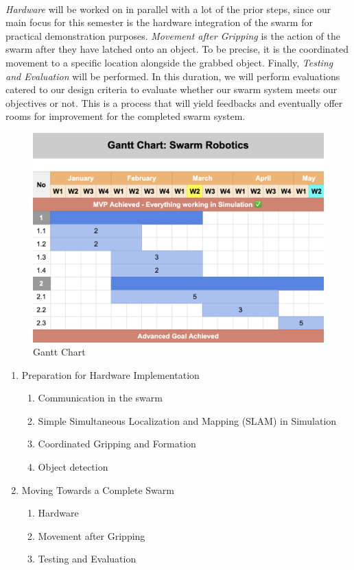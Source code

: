 \paragraph*{}
\textit{Hardware} will be worked on in parallel with a lot of the prior steps, since our main focus for this semester is the hardware integration of the swarm for practical demonstration purposes. \textit{Movement after Gripping} is the action of the swarm after they have latched onto an object. To be precise, it is the coordinated movement to a specific location alongside the grabbed object. Finally, \textit{Testing and Evaluation} will be performed. In this duration, we will perform evaluations catered to our design criteria to evaluate whether our swarm system meets our objectives or not. This is a process that will yield feedbacks and eventually offer rooms for improvement for the completed swarm system.

\begin{figure}
    \centering
    \includegraphics[width=1\linewidth]{assets/images/timeline/gantt_chart.png}
    \caption{Gantt Chart}
    \label{fig:Project Gantt Chart}
\end{figure}

\begin{enumerate}
    \item Preparation for Hardware Implementation
    \begin{enumerate}[label=1.\arabic*]
        \item Communication in the swarm
        \item Simple Simultaneous Localization and Mapping (SLAM) in Simulation
        \item Coordinated Gripping and Formation
        \item Object detection
    \end{enumerate}
    \item Moving Towards a Complete Swarm
    \begin{enumerate}[label=2.\arabic*]
        \item Hardware
        \item Movement after Gripping
        \item Testing and Evaluation
    \end{enumerate}
\end{enumerate}
